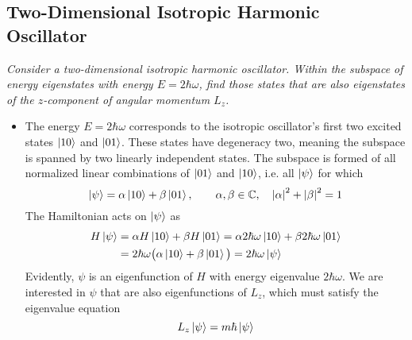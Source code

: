 \documentclass[11pt, a4paper]{article}
\begin{document}
\subsection{Two-Dimensional Isotropic Harmonic Oscillator} \label{qmv:ss:2dqho}
\textit{Consider a two-dimensional isotropic harmonic oscillator. Within the subspace of energy eigenstates with energy $ E = 2\hbar \omega $, find those states that are also eigenstates of the $ z $-component of angular momentum $ L_{z} $.}
\begin{itemize}
	\item The energy $ E = 2\hbar \omega $ corresponds to the isotropic oscillator's first two excited states $ \ket{10} $ and $ \ket{01} $. These states have degeneracy two, meaning the subspace is spanned by two linearly independent states. The subspace is formed of all normalized linear combinations of $ \ket{01} $ and $ \ket{10} $, i.e. all $ \ket{\psi} $ for which
	\begin{equation*}
		\ket{\psi} = \alpha \ket{10} + \beta \ket{01}, \qquad \alpha, \beta \in \mathbb{C}, \quad \abs{\alpha}^{2} + \abs{\beta}^{2} = 1
	\end{equation*}
	The Hamiltonian acts on $ \ket{\psi} $ as
	\begin{align*}
		H \ket{\psi} &= \alpha H \ket{10} + \beta H \ket{01} = \alpha 2\hbar \omega \ket{10} + \beta 2\hbar \omega \ket{01}\\
		&=2\hbar \omega \big(\alpha \ket{10} + \beta \ket{01}\big) = 2\hbar \omega \ket{\psi}
	\end{align*}
	Evidently, $ \psi $ is an eigenfunction of $ H $ with energy eigenvalue $ 2\hbar \omega $.	We are interested in $ \psi $ that are also eigenfunctions of $ L_{z} $, which must satisfy the eigenvalue equation
	\begin{equation*}
		L_{z}\ket{\psi} = m \hbar \ket{\psi}
	\end{equation*}
	

\end{itemize}
\end{document}
